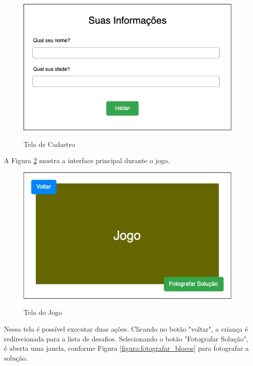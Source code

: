     \begin{figure}[H]
        \caption{Tela de Cadastro}
        \centering
        \includegraphics[width=\linewidth]{Imagens/Cap3/informacoes_usuario.jpg}
        \label{figura:cadastro}
    \end{figure}
    
    A Figura \ref{figura:tela_jogo} mostra a interface principal durante o jogo.
    
    \begin{figure}[H]
        \caption{Tela do Jogo}
        \centering
        \includegraphics[width=\linewidth]{Imagens/Cap3/tela_jogo.jpg}
        \label{figura:tela_jogo}
    \end{figure}
    
    Nessa tela é possível executar duas ações. Clicando no botão "voltar", a criança é redirecionada para a lista de desafios. Selecionando o botão "Fotografar Solução", é aberta uma janela, conforme Figura \ref{figura:fotografar_blocos} para fotografar a solução.
    
